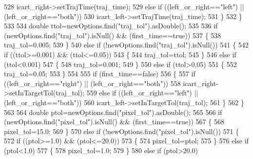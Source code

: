\begin{DoxyCode}
528                 icart\_right->setTrajTime(traj_time);
529             \textcolor{keywordflow}{else} \textcolor{keywordflow}{if} ((left_or_right==\textcolor{stringliteral}{"left"}) || (left_or_right==\textcolor{stringliteral}{"both"}))
530                 icart\_left->setTrajTime(traj_time);
531         \}
532     \}
533 
534     \textcolor{keywordtype}{double} ttol=newOptions.find(\textcolor{stringliteral}{"traj\_tol"}).asDouble();
535 
536     \textcolor{keywordflow}{if} (newOptions.find(\textcolor{stringliteral}{"traj\_tol"}).isNull() && (first\_time==\textcolor{keyword}{true}))
537     \{
538         traj_tol=0.005;
539     \}
540     \textcolor{keywordflow}{else} \textcolor{keywordflow}{if} (!newOptions.find(\textcolor{stringliteral}{"traj\_tol"}).isNull())
541     \{
542         \textcolor{keywordflow}{if} ((ttol>=0.001) && (ttol<=0.05))
543         \{
544             traj_tol=ttol;
545         \}
546         \textcolor{keywordflow}{else} \textcolor{keywordflow}{if} (ttol<0.001)
547         \{
548             traj_tol=0.001;
549         \}
550         \textcolor{keywordflow}{else} \textcolor{keywordflow}{if} (ttol>0.05)
551         \{
552             traj_tol=0.05;
553         \}
554 
555         \textcolor{keywordflow}{if} (first\_time==\textcolor{keyword}{false})
556         \{
557             \textcolor{keywordflow}{if} ((left_or_right==\textcolor{stringliteral}{"right"}) || (left_or_right==\textcolor{stringliteral}{"both"}))
558                 icart\_right->setInTargetTol(traj_tol);
559             \textcolor{keywordflow}{else} \textcolor{keywordflow}{if} ((left_or_right==\textcolor{stringliteral}{"left"}) || (left_or_right==\textcolor{stringliteral}{"both"}))
560                 icart\_left->setInTargetTol(traj_tol);
561         \}
562     \}
563 
564     \textcolor{keywordtype}{double} ptol=newOptions.find(\textcolor{stringliteral}{"pixel\_tol"}).asDouble();
565 
566     \textcolor{keywordflow}{if} (newOptions.find(\textcolor{stringliteral}{"pixel\_tol"}).isNull() && (first\_time==\textcolor{keyword}{true}))
567     \{
568         pixel_tol=15.0;
569     \}
570     \textcolor{keywordflow}{else} \textcolor{keywordflow}{if} (!newOptions.find(\textcolor{stringliteral}{"pixel\_tol"}).isNull())
571     \{
572         \textcolor{keywordflow}{if} ((ptol>=1.0) && (ptol<=20.0))
573         \{
574             pixel_tol=ptol;
575         \}
576         \textcolor{keywordflow}{else} \textcolor{keywordflow}{if} (ptol<1.0)
577         \{
578             pixel_tol=1.0;
579         \}
580         \textcolor{keywordflow}{else} \textcolor{keywordflow}{if} (ptol>20.0)

\end{DoxyCode}
